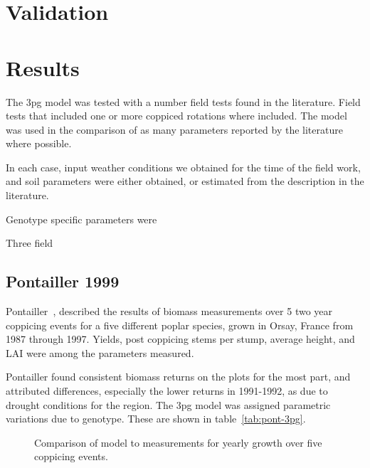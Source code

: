 \documentclass[10pt]{article}
\begin{document}
\section*{Validation}

\section*{Results}

The \ac{3pg} model was tested with a number field tests found in the
literature.  Field tests that included one or more coppiced rotations
where included.  The model was used in the comparison of as many
parameters reported by the literature where possible.  

In each case, input weather conditions we obtained for the time of the
field work, and soil parameters were either obtained, or estimated
from the description in the literature.  

Genotype specific parameters were

Three field
\subsection{Pontailler 1999}
\label{sec:pont}

Pontailler~\cite{Pontailler1999}, described the results of biomass
measurements over 5 two year coppicing events for a five different
poplar species, grown in Orsay, France from 1987 through 1997.
Yields, post coppicing stems per stump, average height, and \ac{LAI}
were among the parameters measured.

Pontailler found consistent biomass returns on the plots for the most
part, and attributed differences, especially the lower returns in
1991-1992, as due to drought conditions for the region.  The \ac{3pg}
model was assigned parametric variations due to genotype.  These are
shown in table~\ref{tab:pont-3pg}.

\begin{table}[!ht]
  \centering
  \caption{\ac{3pg} parameter variations of \ac{3pg} among genotypes}
  \label{tab:pont-3pg}
\end{table}

\begin{figure}[!ht]
  \centering

  \caption{Comparison of model to measurements for yearly growth over five
    coppicing events.}
\label{fig:pont-biomass}
\end{figure}
\end{document}
